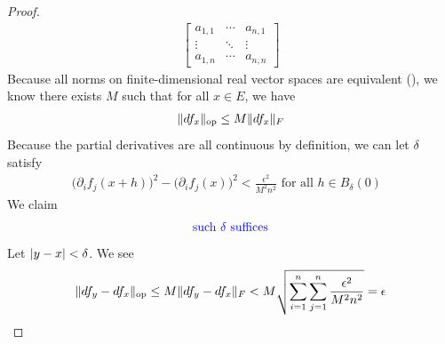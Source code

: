 \documentclass{report}
\begin{document}
\begin{proof}
\begin{align*}
\begin{bmatrix}
  a_{1,1}& \cdots & a_{n,1}\\
  \vdots & \ddots & \vdots \\
  a_{1,n} & \cdots & a_{n,n}  
\end{bmatrix}
\end{align*}
Because all norms on finite-dimensional real vector spaces are equivalent (), we know there exists $M$ such that for all $x\in E$, we have 
\begin{align*}
\| df_x \|_\text{op}\leq  M\| df_x \|_F
\end{align*}
Because the partial derivatives are all continuous by definition, we can let $\delta$ satisfy 
\begin{align*}
  \big(\partial_i f_j(x+h)\big)^2-\big(\partial_i f_j(x)\big)^2< \frac{\epsilon^2 }{M^2n^2}\text{ for all $h \in B_\delta (0)$ }
\end{align*}
We claim 
\begin{align*}
\textcolor{blue}{\text{ such }\delta\text{ suffices }}
\end{align*}
Let $\left|y-x\right|<\delta$. We see 
\begin{align*}
\| df_y-df_x \|_\text{op}\leq M\| df_y -df_x \|_F< M \sqrt{\sum_{i=1}^n \sum_{j=1}^n\frac{\epsilon^2 }{M^2n^2}}=\epsilon 
\end{align*}












\end{proof}
\end{document}
